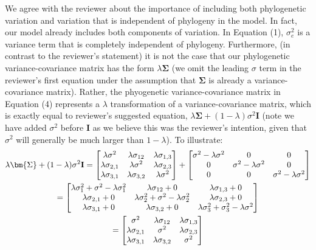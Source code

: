 \documentclass[11pt]{article}
\begin{document}
We agree with the reviewer about the importance of including both phylogenetic variation and variation that is independent of phylogeny in the model. In fact, our model already includes both components of variation. In Equation (1), $\sigma_e^2$ is a variance term that is completely independent of phylogeny. Furthermore, (in contrast to the reviewer's statement) it is not  the case that our phylogenetic variance-covariance matrix has the form $\lambda \bm{\Sigma}$ (we omit the leading $\sigma$ term in the reviewer's first equation under the assumption that $\bm{\Sigma}$ is already a variance-covariance matrix). Rather, the phyogenetic variance-covariance matrix in Equation (4) represents a $\lambda$ transformation of a variance-covariance matrix, which is exactly equal to reviewer's suggested equation, $\lambda \bm{\Sigma} + (1 - \lambda)\sigma^2\bm{I}$ (note we have added $\sigma^2$ before $\bm{I}$ as we believe this was the reviewer's intention, given that $\sigma^2$ will generally be much larger than $1-\lambda$). To illustrate:\\

\begin{multline} \lambda \bm{\Sigma} + (1 - \lambda) \sigma^2{\bf I} =
  \begin{bmatrix}
    \lambda\sigma^2 & \lambda\sigma_{12} & \lambda\sigma_{1,3} \\
    \lambda\sigma_{2,1} & \lambda\sigma^2 & \lambda\sigma_{2,3} \\
    \lambda\sigma_{3,1} & \lambda\sigma_{3,2} & \lambda\sigma^2 \\
  \end{bmatrix}
  +
  \begin{bmatrix}
    \sigma^2 - \lambda\sigma^2 & 0 & 0 \\
    0 & \sigma^2 - \lambda\sigma^2 & 0 \\
    0 & 0 & \sigma^2-\lambda\sigma^2 \\
  \end{bmatrix}
  \\=
  \begin{bmatrix}
    \lambda\sigma_1^2 + \sigma^2 - \lambda\sigma_1^2 & \lambda\sigma_{12} +0 & \lambda\sigma_{1,3} +0\\
    \lambda\sigma_{2,1} +0 & \lambda\sigma_2^2 + \sigma^2 - \lambda\sigma_2^2 & \lambda\sigma_{2,3} +0\\
    \lambda\sigma_{3,1} +0 & \lambda\sigma_{3,2} +0 & \lambda\sigma_3^2 + \sigma_3^2 - \lambda\sigma^2 \\
  \end{bmatrix}
  \\=
  \begin{bmatrix}
    \sigma^2 & \lambda\sigma_{12} & \lambda\sigma_{1,3}\\
    \lambda\sigma_{2,1} & \sigma^2 & \lambda\sigma_{2,3}\\
    \lambda\sigma_{3,1}& \lambda\sigma_{3,2} & \sigma^2\\
  \end{bmatrix}
  \\
\end{multline}
\end{document}
